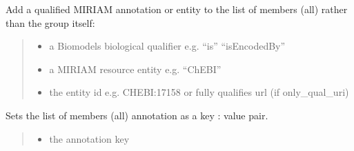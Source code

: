 \documentclass[letterpaper,12pt,english]{sphinxmanual}
\begin{document}
\begin{fulllineitems}
\begin{fulllineitems}
\begin{quote}
\begin{description}
\end{description}\end{quote}

\end{fulllineitems}


\begin{fulllineitems}
\label{\detokenize{api/core:cbmpy.CBModel.Group.addSharedMIRIAMannotation}}
\pysigstartsignatures
\pysiglinewithargsret
{}
{\sphinxparamcomma {}\sphinxparamcomma {}}
{}
\pysigstopsignatures
\sphinxAtStartPar
Add a qualified MIRIAM annotation or entity to the list of members (all) rather than the group itself:
\begin{quote}\begin{description}
\begin{itemize}
\item {} 
\sphinxAtStartPar
{} \textendash{} a Biomodels biological qualifier e.g. “is” “isEncodedBy”

\item {} 
\sphinxAtStartPar
{} \textendash{} a MIRIAM resource entity e.g. “ChEBI”

\item {} 
\sphinxAtStartPar
{} \textendash{} the entity id e.g. CHEBI:17158 or fully qualifies url (if only\_qual\_uri)

\end{itemize}

\end{description}\end{quote}

\end{fulllineitems}


\begin{fulllineitems}
\label{\detokenize{api/core:cbmpy.CBModel.Group.setSharedAnnotation}}
\pysigstartsignatures
\pysiglinewithargsret
{}
{\sphinxparamcomma {}}
{}
\pysigstopsignatures
\sphinxAtStartPar
Sets the list of members (all) annotation as a key : value pair.
\begin{quote}\begin{description}
\begin{itemize}
\item {} 
\sphinxAtStartPar
{} \textendash{} the annotation key


\end{itemize}
\end{description}
\end{quote}
\end{fulllineitems}
\end{fulllineitems}
\end{document}
